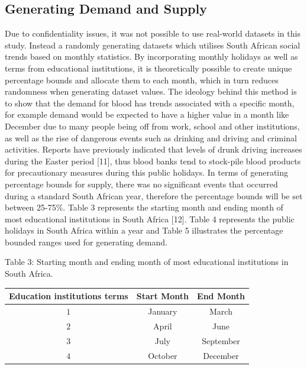 \documentclass{article}
\begin{document}
\subsection{Generating Demand and Supply}
Due to confidentiality issues, it was not possible to use real-world datasets in this study. Instead a randomly generating datasets which utilises South African social trends based on monthly statistics. By incorporating monthly holidays as well as terms from educational institutions, it is theoretically possible to create unique percentage bounds and allocate them to each month, which in turn reduces randomness when generating dataset values. The ideology behind this method is to show that the demand for blood has trends associated with a specific month, for example demand would be expected to have a higher value in a month like December due to many people being off from work, school and other institutions, as well as the rise of dangerous events such as drinking and driving and criminal activities. Reports have previously indicated that levels of drunk driving increases during the Easter period [11], thus blood banks tend to stock-pile blood products for precautionary measures during this public holidays. In terms of generating percentage bounds for supply, there was no significant events that occurred during a standard South African year, therefore the percentage bounds will be set between 25-75\%. Table 3 represents the starting month and ending month of most educational institutions in South Africa [12]. Table 4 represents the public holidays in South Africa within a year and Table 5 illustrates the percentage bounded ranges used for generating demand.
\begin {center}
Table 3: {Starting month and ending month of most educational institutions in South Africa.}

\end {center}
\begin{center}
\begin {tabular}{|c|c|c|}
\hline

Education institutions terms& Start Month&End Month \\ [0.5ex]
\hline

 $1$&January&March\\
  $2$&April&June\\
   $3$&July&September\\
    $4$&October&December\\
\hline

\end {tabular}

\end {center}
\end{document}
